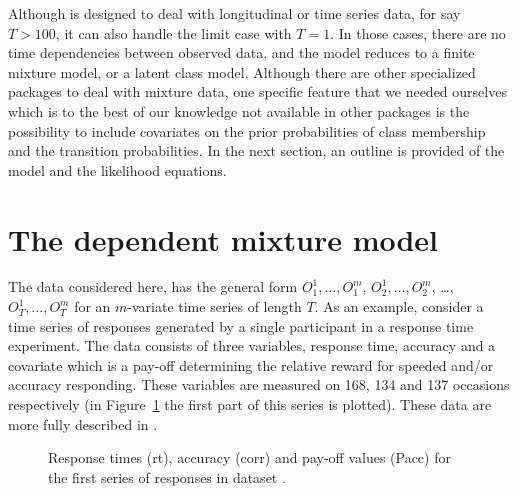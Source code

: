 \documentclass[article]{jss}
\begin{document}
Although  is designed to deal with longitudinal or time
series data, for say $T>100$, it can also handle the limit case with
$T=1$.  In those cases, there are no time dependencies between
observed data, and the model reduces to a finite mixture model, or a
latent class model.  Although there are other specialized packages to
deal with mixture data, one specific feature that we needed ourselves
which is to the best of our knowledge not available in other packages
is the possibility to include covariates on the prior probabilities of
class membership and the transition probabilities. In the next section, 
an outline is provided of the model and the likelihood equations.


\section{The dependent mixture model}

The data considered here, has the general form $O_{1}^{1}, \ldots,
O_{1}^{m}$, $O_{2}^{1}, \ldots, O_{2}^{m}$, \ldots, $O_{T}^{1},
\ldots, O_{T}^{m}$ for an $m$-variate time series of length $T$.  As
an example, consider a time series of responses generated by a single
participant in a response time experiment.  The data consists of three
variables, response time, accuracy and a covariate which is a pay-off
determining the relative reward for speeded and/or accuracy responding. These
variables are measured on 168, 134 and 137 occasions respectively (in
Figure~\ref{fig:speed} the first part of this series is plotted). These data
are more fully described in \citet{Dutilh2009}. 

\begin{figure}[htbp]
  \begin{center}
	  \caption{Response times (rt), accuracy (corr) and pay-off values (Pacc) for
	  the first series of responses in dataset .}
	  \label{fig:speed}
  \end{center}
\end{figure}
\end{document}
